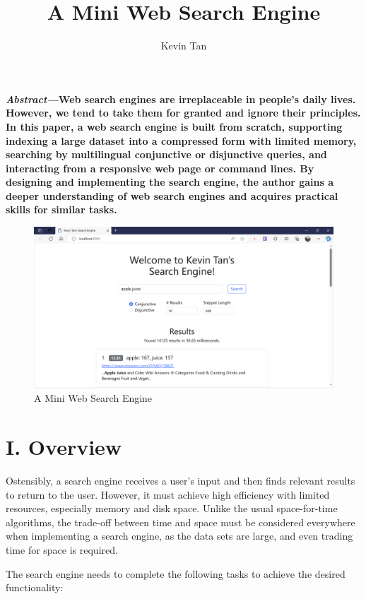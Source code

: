 \documentclass[12pt]{article}
\title{\bf A Mini Web Search Engine}
\author{Kevin Tan}
\date{}
\begin{document}
\maketitle

\textbf{\emph{Abstract---}Web search engines are irreplaceable in
people's daily lives. However, we tend to take them for granted and
ignore their principles. In this paper, a web search engine is built
from scratch, supporting indexing a large dataset into a compressed form
with limited memory, searching by multilingual conjunctive or
disjunctive queries, and interacting from a responsive web page or
command lines. By designing and implementing the search engine, the
author gains a deeper understanding of web search engines and acquires
practical skills for similar tasks.}

\begin{figure}
\includegraphics{readme.assets/image-20231112214558198.png}
\caption{A Mini Web Search Engine}
\label{conjunctive}
\end{figure}

\hypertarget{i-overview}{%
\section{I. Overview}\label{i-overview}}

Ostensibly, a search engine receives a user's input and then finds
relevant results to return to the user. However, it must achieve high
efficiency with limited resources, especially memory and disk space.
Unlike the usual space-for-time algorithms, the trade-off between time
and space must be considered everywhere when implementing a search
engine, as the data sets are large, and even trading time for space is
required.

The search engine needs to complete the following tasks to achieve the
desired functionality:
\end{document}
